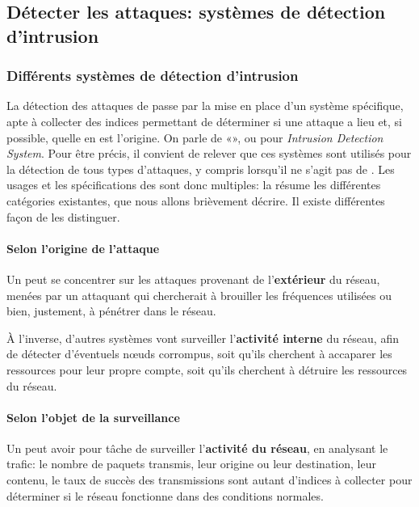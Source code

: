 \subsection{Détecter les attaques: systèmes de détection d'intrusion}

    \subsubsection{Différents systèmes de détection d'intrusion}
La détection des attaques de \dds passe par la mise en place d'un système spécifique, apte à collecter des indices permettant de déterminer si une attaque a lieu et, si possible, quelle en est l'origine.
On parle de «\idss», ou \IDS pour \textit{Intrusion Detection System}.
Pour être précis, il convient de relever que ces systèmes sont utilisés pour la détection de tous types d'attaques, y compris lorsqu'il ne s'agit pas de \dds.
Les usages et les spécifications des \IDS sont donc multiples: la  résume les différentes catégories existantes, que nous allons brièvement décrire.
Il existe différentes façon de les distinguer.


        \paragraph{Selon l'origine de l'attaque}
Un \ids peut se concentrer sur les attaques provenant de l'\textbf{extérieur} du réseau, menées par un attaquant qui chercherait à brouiller les fréquences utilisées ou bien, justement, à pénétrer dans le réseau.

À l'inverse, d'autres systèmes vont surveiller l'\textbf{activité interne} du réseau, afin de détecter d'éventuels nœuds corrompus, soit qu'ils cherchent à accaparer les ressources pour leur propre compte, soit qu'ils cherchent à détruire les ressources du réseau.

        \paragraph{Selon l'objet de la surveillance}\label{ea:sss:hids}
Un \IDS peut avoir pour tâche de surveiller l'\textbf{activité du réseau}, en analysant le trafic: le nombre de paquets transmis, leur origine ou leur destination, leur contenu, le taux de succès des transmissions sont autant d'indices à collecter pour déterminer si le réseau fonctionne dans des conditions normales.

